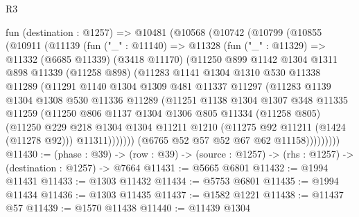 \begin{lexlean}{R3}
\begin{coremodule}
  fun (destination : @1257) =>
  @10481
    (@10568
      (@10742
        (@10799
          (@10855
            (@10911
              (@11139
                (fun ("_" : @11140) =>
                @11328
                  (fun ("_" : @11329) =>
                  @11332
                    (@6685 @11339)
                    (@3418 @11170)
                    (@11250
                      @899
                      @1142
                      @1304
                      @1311
                      @898
                      @11339
                      (@11258 @898)
                      (@11283
                        @1141
                        @1304
                        @1310
                        @530
                        @11338
                        @11289
                        (@11291
                          @1140
                          @1304
                          @1309
                          @481
                          @11337
                          @11297
                          (@11283
                            @1139
                            @1304
                            @1308
                            @530
                            @11336
                            @11289
                            (@11251
                              @1138
                              @1304
                              @1307
                              @348
                              @11335
                              @11259
                              (@11250
                                @806
                                @1137
                                @1304
                                @1306
                                @805
                                @11334
                                (@11258 @805)
                                (@11250
                                  @229
                                  @218
                                  @1304
                                  @1304
                                  @11211
                                  @1210
                                  (@11275 @92 @11211 (@1424 (@11278 @92)))
                                  @11311)))))))
                    (@6765 @52 @57 @52 @67 @62 @11158)))))))))
@11430 := (phase : @39) ->
  (row : @39) -> (source : @1257) -> (rhs : @1257) -> (destination : @1257) -> @7664
@11431 := @5665 @6801
@11432 := @1994 @11431
@11433 := @1303 @11432
@11434 := @5753 @6801
@11435 := @1994 @11434
@11436 := @1303 @11435
@11437 := @1582 @1221
@11438 := @11437 @57
@11439 := @1570 @11438
@11440 := @11439 @1304

\end{coremodule}
\end{lexlean}
